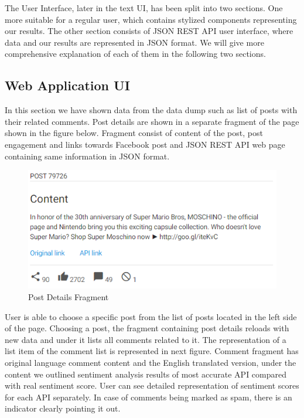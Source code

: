 The User Interface, later in the text UI, has been split into two sections. One more suitable for a regular user, which contains stylized components representing our results. The other section consists of JSON REST API user interface, where data and our results are represented in JSON format. We will give more comprehensive explanation of each of them in the following two sections.

\subsection{Web Application UI}

In this section we have shown data from the data dump such as list of posts with their related comments. Post details are shown in a separate fragment of the page shown in the figure below. Fragment consist of content of the post, post engagement and links towards Facebook post and JSON REST API web page containing same information in JSON format.

\begin{figure}[ht]
	\centering	
	\includegraphics[width=1\textwidth]{04-framework/03-user-interface/images/post_details.png}
	\caption[Post Details Fragment]{Post Details Fragment \label{fig:post-details}}
\end{figure}
 
User is able to choose a specific post from the list of posts located in the left side of the page. Choosing a post, the fragment containing post details reloads with new data and under it lists all comments related to it. The representation of a list item of the comment list is represented in next figure. Comment fragment has original language comment content and the English translated version, under the content we outlined sentiment analysis results of most accurate API compared with real sentiment score. User can see detailed representation of sentiment scores for each API separately. In case of comments being marked as spam, there is an indicator clearly pointing it out.

